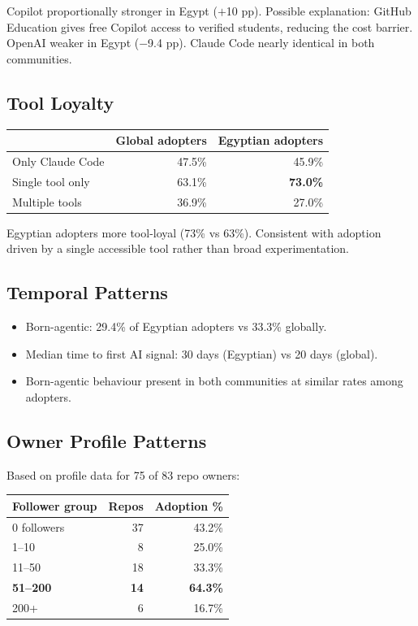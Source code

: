\documentclass[12pt,a4paper]{article}
\begin{document}
Copilot proportionally stronger in Egypt ($+$10 pp). Possible explanation: GitHub Education gives free Copilot access to verified students, reducing the cost barrier. OpenAI weaker in Egypt ($-$9.4 pp). Claude Code nearly identical in both communities.

\subsection{Tool Loyalty}

\begin{table}[h]
\centering
\begin{tabular}{@{}lrr@{}}
\toprule
 & Global adopters & Egyptian adopters \\
\midrule
Only Claude Code      & 47.5\% & 45.9\% \\
Single tool only      & 63.1\% & \textbf{73.0\%} \\
Multiple tools        & 36.9\% & 27.0\% \\
\bottomrule
\end{tabular}
\end{table}

Egyptian adopters more tool-loyal (73\% vs 63\%). Consistent with adoption driven by a single accessible tool rather than broad experimentation.

\subsection{Temporal Patterns}

\begin{itemize}
  \item Born-agentic: 29.4\% of Egyptian adopters vs 33.3\% globally.
  \item Median time to first AI signal: 30 days (Egyptian) vs 20 days (global).
  \item Born-agentic behaviour present in both communities at similar rates among adopters.
\end{itemize}

\subsection{Owner Profile Patterns}

Based on profile data for 75 of 83 repo owners:

\begin{table}[h]
\centering
\begin{tabular}{@{}lrr@{}}
\toprule
Follower group & Repos & Adoption \% \\
\midrule
0 followers         & 37 & 43.2\% \\
1--10               &  8 & 25.0\% \\
11--50              & 18 & 33.3\% \\
\textbf{51--200}    & \textbf{14} & \textbf{64.3\%} \\
200+                &  6 & 16.7\% \\
\bottomrule
\end{tabular}
\end{table}
\end{document}
